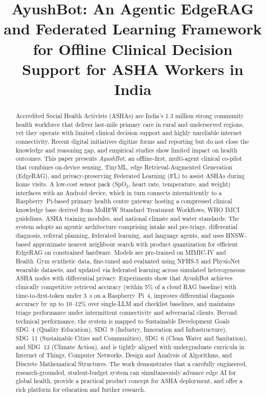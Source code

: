 \documentclass[conference]{IEEEtran}
\title{AyushBot: An Agentic EdgeRAG and Federated Learning Framework for Offline Clinical Decision Support for ASHA Workers in India}
\author{\IEEEauthorblockN{First Author, Second Author, Third Author, Fourth Author}%
\IEEEauthorblockA{Department of Computer Science and Engineering\\Your Institute Name, City, India\\Email: first.author@domain.com}}
\begin{document}
\maketitle

\begin{abstract}
Accredited Social Health Activists (ASHAs) are India's 1.3 million strong community health workforce that deliver last-mile primary care in rural and underserved regions, yet they operate with limited clinical decision support and highly unreliable internet connectivity. Recent digital initiatives digitize forms and reporting but do not close the knowledge and reasoning gap, and empirical studies show limited impact on health outcomes. This paper presents \emph{AyushBot}, an offline-first, multi-agent clinical co-pilot that combines on-device sensing, TinyML, edge Retrieval-Augmented Generation (EdgeRAG), and privacy-preserving Federated Learning (FL) to assist ASHAs during home visits. A low-cost sensor pack (SpO$_2$, heart rate, temperature, and weight) interfaces with an Android device, which in turn connects intermittently to a Raspberry~Pi-based primary health centre gateway hosting a compressed clinical knowledge base derived from MoHFW Standard Treatment Workflows, WHO IMCI guidelines, ASHA training modules, and national climate and water standards. The system adopts an agentic architecture comprising intake and pre-triage, differential diagnosis, referral planning, federated learning, and language agents, and uses HNSW-based approximate nearest neighbour search with product quantization for efficient EdgeRAG on constrained hardware. Models are pre-trained on MIMIC-IV and Health~Gym synthetic data, fine-tuned and evaluated using NFHS-5 and PhysioNet wearable datasets, and updated via federated learning across simulated heterogeneous ASHA nodes with differential privacy. Experiments show that AyushBot achieves clinically competitive retrieval accuracy (within 5\% of a cloud RAG baseline) with time-to-first-token under 3~s on a Raspberry~Pi~4, improves differential diagnosis accuracy by up to 10--12\% over single-LLM and checklist baselines, and maintains triage performance under intermittent connectivity and adversarial clients. Beyond technical performance, the system is mapped to Sustainable Development Goals SDG~4 (Quality Education), SDG~9 (Industry, Innovation and Infrastructure), SDG~11 (Sustainable Cities and Communities), SDG~6 (Clean Water and Sanitation), and SDG~13 (Climate Action), and is tightly aligned with undergraduate curricula in Internet of Things, Computer Networks, Design and Analysis of Algorithms, and Discrete Mathematical Structures. The work demonstrates that a carefully engineered, research-grounded, student-budget system can simultaneously advance edge AI for global health, provide a practical product concept for ASHA deployment, and offer a rich platform for education and further research.
\end{abstract}
\end{document}
